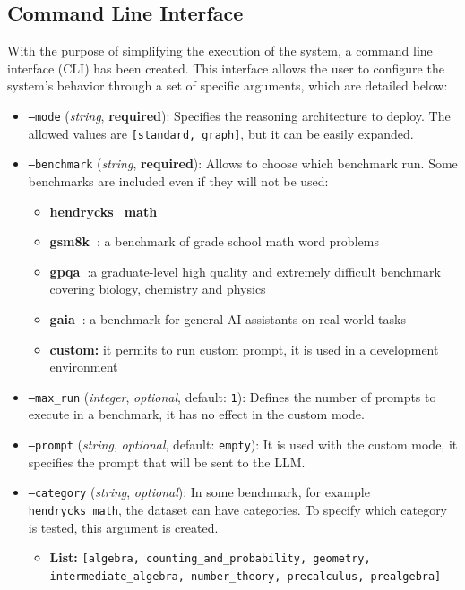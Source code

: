 \documentclass[12pt,a4paper,openright,twoside]{book}
\begin{document}
\subsection{Command Line Interface}
With the purpose of simplifying the execution of the system, a command line interface (CLI) has been created.
This interface allows the user to configure the system's behavior through a set of specific arguments, which are detailed below:
\begin{itemize}
    \item \texttt{--mode} (\textit{string}, \textbf{required}): Specifies the reasoning architecture to deploy. The allowed values are \texttt{[standard, graph]}, but it can be easily expanded.
    \item \texttt{--benchmark} (\textit{string}, \textbf{required}): Allows to choose which benchmark run. Some benchmarks are included even if they will not be used: 
    \begin{itemize}
        \item \textbf{hendrycks\_math~\cite{hendrycksmath2021}}
        \item \textbf{gsm8k~\cite{cobbe2021gsm8k}}: a benchmark of grade school math word problems
        \item \textbf{gpqa~\cite{rein2023gpqa}}:a graduate-level high quality and extremely difficult benchmark covering biology, chemistry and physics
        \item \textbf{gaia~\cite{mialon2023gaia}}: a benchmark for general AI assistants on real-world tasks
        \item \textbf{custom:} it permits to run custom prompt, it is used in a development environment
    \end{itemize} 
    \item \texttt{--max\_run} (\textit{integer}, \textit{optional}, default: \texttt{1}): Defines the number of prompts to execute in a benchmark, it has no effect in the custom mode. 
    \item \texttt{--prompt} (\textit{string}, \textit{optional}, default: \texttt{empty}): It is used with the custom mode, it specifies the prompt that will be sent to the LLM.
    \item \texttt{--category} (\textit{string}, \textit{optional}): In some benchmark, for example \texttt{hendrycks\_math}, the dataset can have categories. To specify which category is tested, this argument is created.  
    \begin{itemize}
        \item \textbf{List:} \texttt{[algebra,
            counting\_and\_probability,
            geometry,
            intermediate\_algebra,
            number\_theory,
            precalculus,
            prealgebra]}
    \end{itemize}
\end{itemize}
\end{document}
